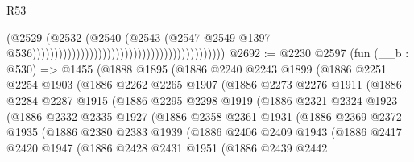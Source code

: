 \begin{lexlean}{R53}
\begin{coremodule}
                                                                                  (@2529
                                                                                    (@2532
                                                                                      (@2540
                                                                                        (@2543
                                                                                          (@2547
                                                                                            @2549
                                                                                            @1397
                                                                                            @536))))))))))))))))))))))))))))))))))))))))))))
@2692 := @2230
    @2597
    (fun (__b : @530) =>
    @1455
      (@1888
        @1895
        (@1886
          @2240
          @2243
          @1899
          (@1886
            @2251
            @2254
            @1903
            (@1886
              @2262
              @2265
              @1907
              (@1886
                @2273
                @2276
                @1911
                (@1886
                  @2284
                  @2287
                  @1915
                  (@1886
                    @2295
                    @2298
                    @1919
                    (@1886
                      @2321
                      @2324
                      @1923
                      (@1886
                        @2332
                        @2335
                        @1927
                        (@1886
                          @2358
                          @2361
                          @1931
                          (@1886
                            @2369
                            @2372
                            @1935
                            (@1886
                              @2380
                              @2383
                              @1939
                              (@1886
                                @2406
                                @2409
                                @1943
                                (@1886
                                  @2417
                                  @2420
                                  @1947
                                  (@1886
                                    @2428
                                    @2431
                                    @1951
                                    (@1886
                                      @2439
                                      @2442

\end{coremodule}
\end{lexlean}
